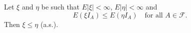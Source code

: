Let $\xi$ and $\eta$ be such that $E|\xi| < \infty$, $E|\eta| < \infty$ and
$$E(\xi I_A) \leq E(\eta I_A) \quad \text{for all } A \in \mathcal{F}.$$
Then $\xi \leq \eta$ (a.s.).
